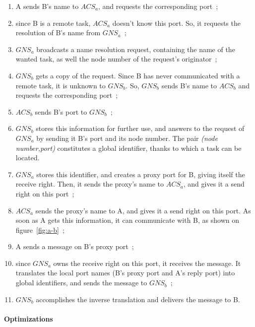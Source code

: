\begin{enumerate}
\item A sends B's name to \(ACS_{a}\), and requests the corresponding port~;
\item since B is a remote task, \(ACS_{a}\) doesn't know this port. So, it 
requests the resolution of B's name from \(GNS_{a}\)~;
\item \(GNS_{a}\) broadcasts a name resolution request, containing the name of 
the wanted task, as well the node number of the request's originator~;
\item \(GNS_{b}\) gets a copy of the request. Since B has never communicated with
a remote task, it is unknown to \(GNS_{b}\). So, \(GNS_{b}\) sends B's name to 
\(ACS_{b}\) and requests the corresponding port~;
\item \(ACS_{b}\) sends B's port to \(GNS_{b}\)~;
\item \(GNS_{b}\) stores this information for further use, and answers to 
the request of \(GNS_{a}\) by sending it B's port and its node number. The pair 
{\it (node number,port)} constitutes a global identifier, thanks to which 
a task can be located.
\item \(GNS_{a}\) stores this identifier, and creates a proxy port for B, 
giving itself the receive right. Then, it sends the proxy's name to 
\(ACS_{a}\), and gives it a send right on this port~;
\item \(ACS_{a}\) sends the proxy's name to A, and gives it a send right on 
this port. As soon as A gets this information, it can communicate with B, 
as shown on figure~\ref{fig:a-b}~;


\item A sends a message on B's proxy port~;
\item since \(GNS_{a}\) owns the receive right on this port, it receives the
 message. It translates the local port names (B's proxy port and A's reply port) into global identifiers, and sends the message to \(GNS_{b}\)~;
\item \(GNS_{b}\) accomplishes the inverse translation and delivers the message 
to B.
\end{enumerate}

\paragraph{Optimizations}


